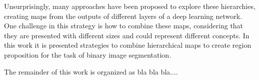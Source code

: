 Unsurprisingly, many approaches have been proposed to explore these hierarchies, creating maps from the outputs of different layers of a deep learning network. One challenge in this strategy is how to combine these maps, considering that they are presented with different sizes and could represent different concepts. In this work it is presented strategies to combine hierarchical maps to create region proposition for the task of binary image segmentation.   

The remainder of this work is organized as bla bla bla....

